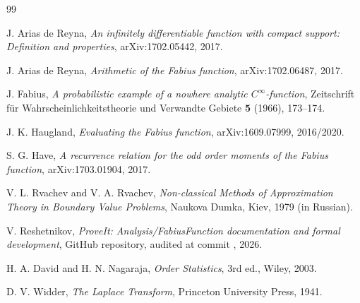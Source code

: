 \documentclass[11pt,oneside]{article}
\theoremstyle{definition}
\theoremstyle{remark}
\begin{document}
\begin{thebibliography}{99}

J. Arias de Reyna,
\emph{An infinitely differentiable function with compact support: Definition
and properties}, arXiv:1702.05442, 2017.

J. Arias de Reyna,
\emph{Arithmetic of the Fabius function}, arXiv:1702.06487, 2017.

J. Fabius,
\emph{A probabilistic example of a nowhere analytic \(C^\infty\)-function},
Zeitschrift f\"ur Wahrscheinlichkeitstheorie und Verwandte Gebiete
\textbf{5} (1966), 173--174.

J. K. Haugland,
\emph{Evaluating the Fabius function}, arXiv:1609.07999, 2016/2020.

S. G. Have,
\emph{A recurrence relation for the odd order moments of the Fabius function},
arXiv:1703.01904, 2017.

V. L. Rvachev and V. A. Rvachev,
\emph{Non-classical Methods of Approximation Theory in Boundary Value Problems},
Naukova Dumka, Kiev, 1979 (in Russian).

V. Reshetnikov,
\emph{ProveIt: Analysis/FabiusFunction documentation and formal development},
GitHub repository, audited at commit
, 2026.

H. A. David and H. N. Nagaraja,
\emph{Order Statistics}, 3rd ed., Wiley, 2003.

D. V. Widder,
\emph{The Laplace Transform}, Princeton University Press, 1941.

\end{thebibliography}
\end{document}
